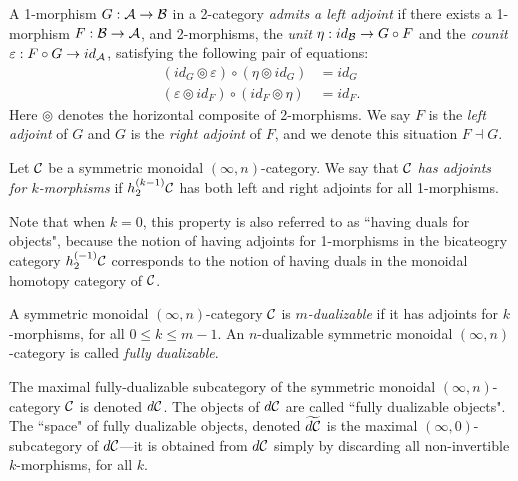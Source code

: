 \documentclass{amsart}
\begin{document}
\begin{appdefinition} \label{def:adjoints_in_bicat}
		A 1-morphism $G: \mathcal A \to \mathcal B$ in a 2-category {\em admits a left adjoint} if there exists a 1-morphism $F: \mathcal B \to \mathcal A$, and 2-morphisms, the {\em unit} $\eta: id_{\mathcal B} \to G \circ F$ and the {\em counit} $\varepsilon: F \circ G \to id_{\mathcal A}$, satisfying the following pair of equations:
		\begin{align*}
			(id_{G} \circledcirc \varepsilon  ) \circ (  \eta \circledcirc id_{G}) &= id_{G} \\
			(\varepsilon \circledcirc id_{F}) \circ (id_{F} \circledcirc \eta) &= id_{F}.
		\end{align*}
	Here $\circledcirc$ denotes the horizontal composite of 2-morphisms.
	We say $F$ is the {\em left adjoint} of $G$ and $G$ is the {\em right adjoint} of $F$, and we denote this situation $F \dashv G$.
\end{appdefinition}

\begin{appdefinition}
	Let $\mathcal C$ be a symmetric monoidal $(\infty,n)$-category. We say that $\mathcal C$ {\em has adjoints for $k$-morphisms} if $h^{(k-1)}_2 \mathcal C$ has both left and right adjoints for all 1-morphisms. 
\end{appdefinition}

\noindent Note that when $k=0$, this property is also referred to as ``having duals for objects", because the notion of having adjoints for 1-morphisms in the bicateogry category $h^{(-1)}_2 \mathcal C$ corresponds to the notion of having duals in the monoidal homotopy category of $\mathcal C$.

\begin{appdefinition}
A symmetric monoidal $(\infty,n)$-category $\mathcal C$ is \emph{$m$-dualizable} if it has adjoints for $k$-morphisms, for all $0 \leq k \leq m-1$.  An $n$-dualizable symmetric monoidal $(\infty,n)$-category is called \emph{fully dualizable}.
\end{appdefinition}

\noindent The maximal fully-dualizable subcategory of the symmetric monoidal $(\infty,n)$-category $\mathcal C$ is denoted $d\mathcal C$. The objects of $d\mathcal C$ are called ``fully dualizable objects".  The ``space" of fully dualizable objects, denoted $\widetilde{d\mathcal C}$ is the maximal $(\infty,0)$-subcategory of $d\mathcal C$---it is obtained from $d\mathcal C$ simply by discarding all non-invertible $k$-morphisms, for all $k$.
\end{document}
